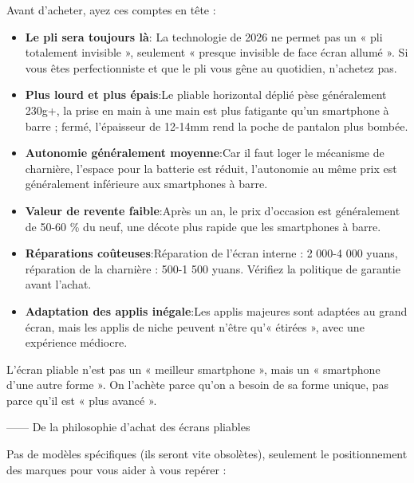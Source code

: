 
Avant d'acheter, ayez ces comptes en tête :

\begin{itemize}
  \item \textbf{Le pli sera toujours là}: La technologie de 2026 ne permet pas un « pli totalement invisible », seulement « presque invisible de face écran allumé ». Si vous êtes perfectionniste et que le pli vous gêne au quotidien, n'achetez pas.
  \item \textbf{Plus lourd et plus épais}:Le pliable horizontal déplié pèse généralement 230g+, la prise en main à une main est plus fatigante qu'un smartphone à barre ; fermé, l'épaisseur de 12-14mm rend la poche de pantalon plus bombée.
  \item \textbf{Autonomie généralement moyenne}:Car il faut loger le mécanisme de charnière, l'espace pour la batterie est réduit, l'autonomie au même prix est généralement inférieure aux smartphones à barre.
  \item \textbf{Valeur de revente faible}:Après un an, le prix d'occasion est généralement de 50-60 \% du neuf, une décote plus rapide que les smartphones à barre.
  \item \textbf{Réparations coûteuses}:Réparation de l'écran interne : 2 000-4 000 yuans, réparation de la charnière : 500-1 500 yuans. Vérifiez la politique de garantie avant l'achat.
  \item \textbf{Adaptation des applis inégale}:Les applis majeures sont adaptées au grand écran, mais les applis de niche peuvent n'être qu'« étirées », avec une expérience médiocre.
\end{itemize}

L'écran pliable n'est pas un « meilleur smartphone », mais un « smartphone d'une autre forme ». On l'achète parce qu'on a besoin de sa forme unique, pas parce qu'il est « plus avancé ».

—— De la philosophie d'achat des écrans pliables


Pas de modèles spécifiques (ils seront vite obsolètes), seulement le positionnement des marques pour vous aider à vous repérer :

